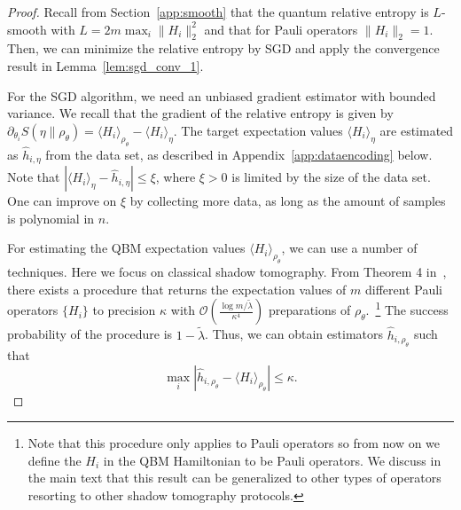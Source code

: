 \documentclass[
    aps,
    prx,
    floatfix,
    nofootinbib,
    onecolumn
]{revtex4-2}
\begin{document}
\begin{proof}
Recall from Section~\ref{app:smooth} that the quantum relative entropy is $L$-smooth with $L=2 m \max_i \| H_i \|_2^2$ and that for Pauli operators $\| H_i \|_2 = 1$. Then, we can minimize the relative entropy by SGD and apply the convergence result in Lemma~\ref{lem:sgd_conv_1}. 

For the SGD algorithm, we need an unbiased gradient estimator with bounded variance. We recall that the gradient of the relative entropy is given by $\partial_{\theta_i} S(\eta \|\rho_\theta)  = \langle H_i \rangle_{\rho_\theta} - \langle H_i\rangle_\eta$. The target expectation values $\langle H_i\rangle_\eta$ are estimated as $\hat{h}_{i,\eta}$ from the data set, as described in Appendix~\ref{app:dataencoding} below. Note that $| \langle H_i\rangle_\eta - \hat{h}_{i,\eta} | \leq \xi$, where $\xi >0$ is limited by the size of the data set. One can improve on $\xi$ by collecting more data, as long as the amount of samples is polynomial in $n$.

For estimating the QBM expectation values $\langle H_i \rangle_{\rho_\theta}$, we can use a number of techniques. Here we focus on classical shadow tomography. From Theorem 4 in~\cite{Huang_2021}, there exists a procedure that returns the expectation values of $m$ different Pauli operators $\{H_i\}$ to precision $\kappa$ with $\mathcal{O}(\frac{\log{m/\tilde{\lambda}}}{\kappa^4})$ preparations of $\rho_\theta$.~\footnote{Note that this procedure only applies to Pauli operators so from now on we define the $H_i$ in the QBM Hamiltonian to be Pauli operators. We discuss in the main text that this result can be generalized to other types of operators resorting to other shadow tomography protocols.} The success probability of the procedure is $1-\tilde{\lambda}$. Thus, we can obtain estimators $\hat{h}_{i, \rho_\theta}$ such that 
\begin{equation}
\label{eq:shadows}
    \max_i |\hat{h}_{i, \rho_\theta} - \langle H_i\rangle_{\rho_\theta}| \leq \kappa. 
\end{equation} 


\end{proof}
\end{document}
